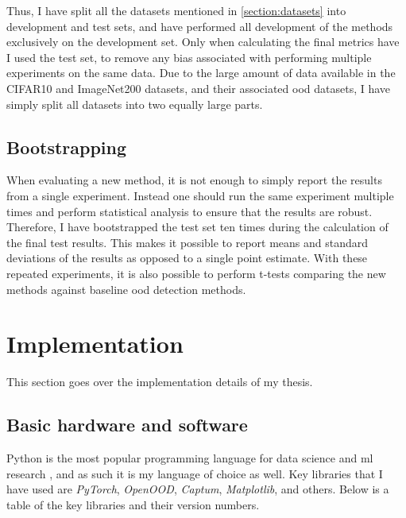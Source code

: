 \documentclass[UKenglish]{uiomasterthesis} %
\theoremstyle{definition}
\begin{document}
Thus, I have split all the datasets mentioned in \ref{section:datasets} into development and test sets, and have performed all development of the methods exclusively on the development set. Only when calculating the final metrics have I used the test set, to remove any bias associated with performing multiple experiments on the same data. Due to the large amount of data available in the CIFAR10 and ImageNet200 datasets, and their associated \ac{ood} datasets, I have simply split all datasets into two equally large parts.

\subsection{Bootstrapping}

When evaluating a new method, it is not enough to simply report the results from a single experiment. Instead one should run the same experiment multiple times and perform statistical analysis to ensure that the results are robust. Therefore, I have bootstrapped the test set ten times during the calculation of the final test results. This makes it possible to report means and standard deviations of the results as opposed to a single point estimate. With these repeated experiments, it is also possible to perform t-tests comparing the new methods against baseline \ac{ood} detection methods.

\section{Implementation}

This section goes over the implementation details of my thesis.

\subsection{Basic hardware and software}

Python is the most popular programming language for data science and \ac{ml} research \cite{nguyen2019machine}, and as such it is my language of choice as well. Key libraries that I have used are {\it PyTorch}, {\it OpenOOD}, {\it Captum}, {\it Matplotlib}, and others. Below is a table of the key libraries and their version numbers.
\end{document}
